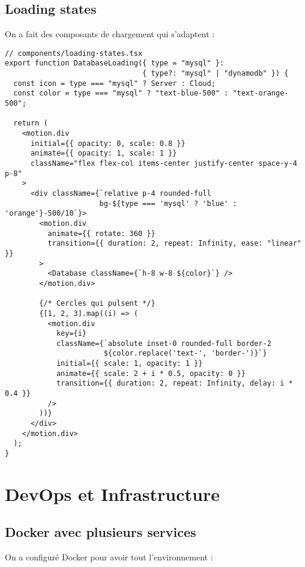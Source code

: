 \documentclass[12pt,a4paper]{report}
\begin{document}
\section{Loading states}

On a fait des composants de chargement qui s'adaptent :

\begin{lstlisting}[caption=États de chargement avec animations]
// components/loading-states.tsx
export function DatabaseLoading({ type = "mysql" }: 
                                { type?: "mysql" | "dynamodb" }) {
  const icon = type === "mysql" ? Server : Cloud;
  const color = type === "mysql" ? "text-blue-500" : "text-orange-500";

  return (
    <motion.div
      initial={{ opacity: 0, scale: 0.8 }}
      animate={{ opacity: 1, scale: 1 }}
      className="flex flex-col items-center justify-center space-y-4 p-8"
    >
      <div className={`relative p-4 rounded-full 
                      bg-${type === 'mysql' ? 'blue' : 'orange'}-500/10`}>
        <motion.div
          animate={{ rotate: 360 }}
          transition={{ duration: 2, repeat: Infinity, ease: "linear" }}
        >
          <Database className={`h-8 w-8 ${color}`} />
        </motion.div>
        
        {/* Cercles qui pulsent */}
        {[1, 2, 3].map((i) => (
          <motion.div
            key={i}
            className={`absolute inset-0 rounded-full border-2 
                       ${color.replace('text-', 'border-')}`}
            initial={{ scale: 1, opacity: 1 }}
            animate={{ scale: 2 + i * 0.5, opacity: 0 }}
            transition={{ duration: 2, repeat: Infinity, delay: i * 0.4 }}
          />
        ))}
      </div>
    </motion.div>
  );
}
\end{lstlisting}

\chapter{DevOps et Infrastructure}

\section{Docker avec plusieurs services}

On a configuré Docker pour avoir tout l'environnement :
\end{document}
